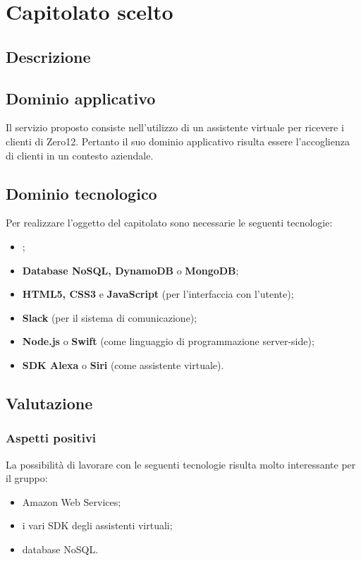 \section {Capitolato scelto}
	\subsection {Descrizione}
		\SCOPO
	\subsection {Dominio applicativo}
Il servizio proposto consiste nell'utilizzo di un assistente virtuale per ricevere i clienti di Zero12. Pertanto il suo dominio applicativo risulta essere l'accoglienza di clienti in un contesto aziendale.
	\subsection {Dominio tecnologico}
		Per realizzare l'oggetto del capitolato sono necessarie le seguenti tecnologie:
		\begin {itemize}
			\item \textbf{};
			\item \textbf{Database NoSQL, DynamoDB} o \textbf{MongoDB};
			\item \textbf{HTML5, CSS3} e \textbf{JavaScript} (per l'interfaccia con l'utente);
			\item \textbf{Slack} (per il sistema di comunicazione);
			\item \textbf{Node.js} o \textbf{Swift} (come linguaggio di programmazione
 server-side);
 			\item \textbf{SDK Alexa} o \textbf{Siri} (come assistente virtuale).

		\end {itemize}
	\subsection {Valutazione}
		\subsubsection {Aspetti positivi}
			 La possibilità di lavorare con le seguenti tecnologie risulta molto interessante per il gruppo:
				 \begin {itemize}
				 	\item Amazon Web Services;
				 	\item i vari SDK degli assistenti virtuali;
				 	\item database NoSQL.
				 \end {itemize}
